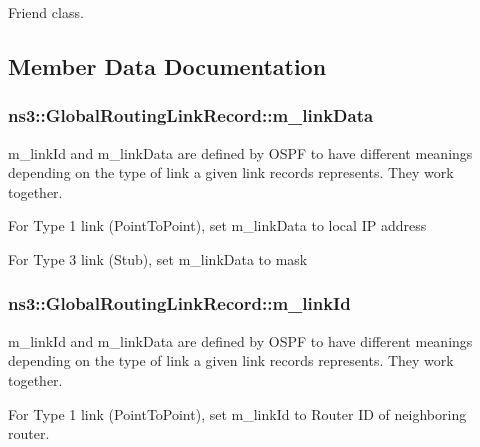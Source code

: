 Friend class. 



\subsection{Member Data Documentation}
\subsubsection[{\texorpdfstring{m\+\_\+link\+Data}{m_linkData}}]{ ns3\+::\+Global\+Routing\+Link\+Record\+::m\+\_\+link\+Data\hspace{0.3cm}{\ttfamily [private]}}\hypertarget{classns3_1_1GlobalRoutingLinkRecord_a62c1a677af17f0fd5fa783a17ce4f565}{}\label{classns3_1_1GlobalRoutingLinkRecord_a62c1a677af17f0fd5fa783a17ce4f565}
m\+\_\+link\+Id and m\+\_\+link\+Data are defined by O\+S\+PF to have different meanings depending on the type of link a given link records represents. They work together.

For Type 1 link (Point\+To\+Point), set m\+\_\+link\+Data to local IP address

For Type 3 link (Stub), set m\+\_\+link\+Data to mask 
\subsubsection[{\texorpdfstring{m\+\_\+link\+Id}{m_linkId}}]{ ns3\+::\+Global\+Routing\+Link\+Record\+::m\+\_\+link\+Id\hspace{0.3cm}{\ttfamily [private]}}\hypertarget{classns3_1_1GlobalRoutingLinkRecord_a55be7d599d645418645cfd2231ce603f}{}\label{classns3_1_1GlobalRoutingLinkRecord_a55be7d599d645418645cfd2231ce603f}
m\+\_\+link\+Id and m\+\_\+link\+Data are defined by O\+S\+PF to have different meanings depending on the type of link a given link records represents. They work together.

For Type 1 link (Point\+To\+Point), set m\+\_\+link\+Id to Router ID of neighboring router.

